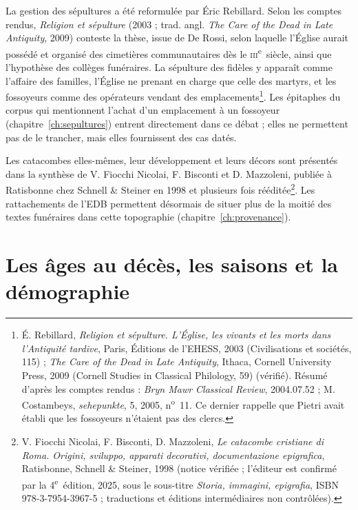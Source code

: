 La gestion des sépultures a été reformulée par Éric Rebillard. Selon les comptes rendus, \emph{Religion et sépulture} (2003 ; trad. angl. \emph{The Care of the Dead in Late Antiquity}, 2009) conteste la thèse, issue de De Rossi, selon laquelle l’Église aurait possédé et organisé des cimetières communautaires dès le \textsc{iii}\textsuperscript{e}~siècle, ainsi que l’hypothèse des collèges funéraires. La sépulture des fidèles y apparaît comme l’affaire des familles, l’Église ne prenant en charge que celle des martyrs, et les fossoyeurs comme des opérateurs vendant des emplacements\footnote{É. Rebillard, \emph{Religion et sépulture. L’Église, les vivants et les morts dans l’Antiquité tardive}, Paris, Éditions de l’EHESS, 2003 (Civilisations et sociétés, 115) ; \emph{The Care of the Dead in Late Antiquity}, Ithaca, Cornell University Press, 2009 (Cornell Studies in Classical Philology, 59) (vérifié). Résumé d’après les comptes rendus : \emph{Bryn Mawr Classical Review}, 2004.07.52 ; M. Costambeys, \emph{sehepunkte}, 5, 2005, n\textsuperscript{o}~11. Ce dernier rappelle que Pietri avait établi que les fossoyeurs n’étaient pas des clercs.}. Les épitaphes du corpus qui mentionnent l’achat d’un emplacement à un fossoyeur (chapitre~\ref{ch:sepultures}) entrent directement dans ce débat ; elles ne permettent pas de le trancher, mais elles fournissent des cas datés.

Les catacombes elles-mêmes, leur développement et leurs décors sont présentés dans la synthèse de V. Fiocchi Nicolai, F. Bisconti et D. Mazzoleni, publiée à Ratisbonne chez Schnell \& Steiner en 1998 et plusieurs fois rééditée\footnote{V. Fiocchi Nicolai, F. Bisconti, D. Mazzoleni, \emph{Le catacombe cristiane di Roma. Origini, sviluppo, apparati decorativi, documentazione epigrafica}, Ratisbonne, Schnell \& Steiner, 1998 (notice vérifiée ; l’éditeur est confirmé par la 4\textsuperscript{e}~édition, 2025, sous le sous-titre \emph{Storia, immagini, epigrafia}, ISBN 978-3-7954-3967-5 ; traductions et éditions intermédiaires non contrôlées).}. Les rattachements de l’EDB permettent désormais de situer plus de la moitié des textes funéraires dans cette topographie (chapitre~\ref{ch:provenance}).

\section{Les âges au décès, les saisons et la démographie}

